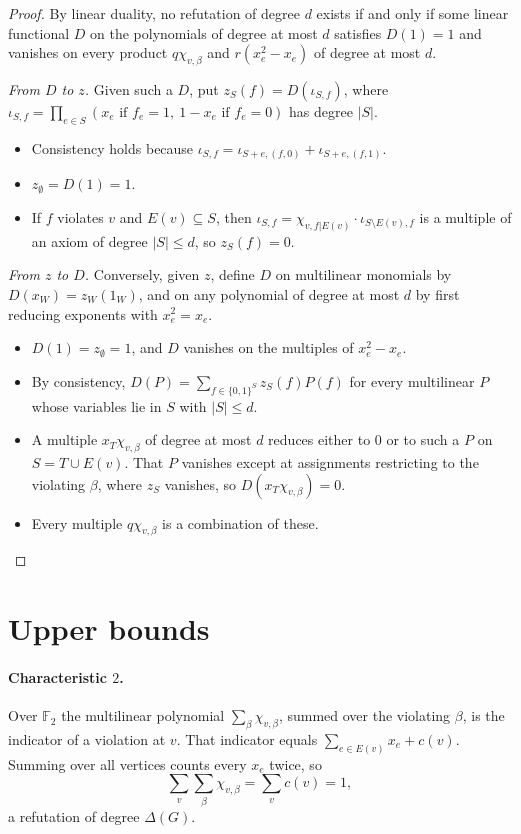 \documentclass[11pt]{article}
\theoremstyle{definition}
\theoremstyle{remark}
\begin{document}
\begin{proof}
By linear duality, no refutation of degree $d$ exists if and only if some
linear functional $D$ on the polynomials of degree at most $d$ satisfies
$D(1)=1$ and vanishes on every product $q\chi_{v,\beta}$ and $r(x_e^2-x_e)$ of
degree at most $d$.

\emph{From $D$ to $z$.} Given such a $D$, put $z_S(f)=D(\iota_{S,f})$, where
$\iota_{S,f}=\prod_{e\in S}(x_e\text{ if }f_e=1,\ 1-x_e\text{ if }f_e=0)$ has
degree $|S|$.
\begin{itemize}
\item Consistency holds because $\iota_{S,f}=\iota_{S+e,(f,0)}+\iota_{S+e,(f,1)}$.
\item $z_\emptyset=D(1)=1$.
\item If $f$ violates $v$ and $E(v)\subseteq S$, then
$\iota_{S,f}=\chi_{v,f|E(v)}\cdot\iota_{S\setminus E(v),f}$ is a multiple of
an axiom of degree $|S|\le d$, so $z_S(f)=0$.
\end{itemize}

\emph{From $z$ to $D$.} Conversely, given $z$, define $D$ on multilinear
monomials by $D(x_W)=z_W(1_W)$, and on any polynomial of degree at most $d$ by
first reducing exponents with $x_e^2=x_e$.
\begin{itemize}
\item $D(1)=z_\emptyset=1$, and $D$ vanishes on the multiples of $x_e^2-x_e$.
\item By consistency, $D(P)=\sum_{f\in\{0,1\}^S}z_S(f)P(f)$ for every
multilinear $P$ whose variables lie in $S$ with $|S|\le d$.
\item A multiple $x_T\chi_{v,\beta}$ of degree at most $d$ reduces either to
$0$ or to such a $P$ on $S=T\cup E(v)$. That $P$ vanishes except at
assignments restricting to the violating $\beta$, where $z_S$ vanishes, so
$D(x_T\chi_{v,\beta})=0$.
\item Every multiple $q\chi_{v,\beta}$ is a combination of these. \qedhere
\end{itemize}
\end{proof}

\section{Upper bounds}

\paragraph{Characteristic $2$.} Over $\mathbb F_2$ the multilinear polynomial
$\sum_{\beta}\chi_{v,\beta}$, summed over the violating $\beta$, is the
indicator of a violation at $v$. That indicator equals
$\sum_{e\in E(v)}x_e+c(v)$. Summing over all vertices counts every $x_e$ twice,
so
\[
\textstyle\sum_v\sum_\beta\chi_{v,\beta}=\sum_v c(v)=1,
\]
a refutation of degree $\Delta(G)$.
\end{document}
